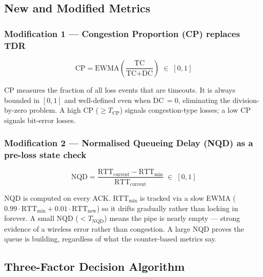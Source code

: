 \documentclass[12pt,a4paper]{article}
\begin{document}
\subsection{New and Modified Metrics}

\subsubsection*{Modification 1 — Congestion Proportion (CP) replaces TDR}

\[
  \text{CP} = \text{EWMA}\!\left(\frac{\text{TC}}{\text{TC}+\text{DC}}\right)
  \;\in\; [0,1]
\]

CP measures the fraction of all loss events that are timeouts. It is always
bounded in $[0,1]$ and well-defined even when DC\,$=0$, eliminating the
division-by-zero problem. A high CP ($\geq T_\text{CP}$) signals
congestion-type losses; a low CP signals bit-error losses.

\subsubsection*{Modification 2 — Normalised Queueing Delay (NQD) as a
pre-loss state check}

\[
  \text{NQD}
  = \frac{\text{RTT}_\text{current} - \text{RTT}_\text{min}}
         {\text{RTT}_\text{current}}
  \;\in\; [0,1]
\]

NQD is computed on every ACK. $\text{RTT}_\text{min}$ is tracked via a slow
EWMA ($0.99 \cdot \text{RTT}_\text{min} + 0.01 \cdot \text{RTT}_\text{new}$)
so it drifts gradually rather than locking in forever. A small NQD
($< T_\text{NQD}$) means the pipe is nearly empty — strong evidence of a
wireless error rather than congestion. A large NQD proves the queue is
building, regardless of what the counter-based metrics say.

\subsection{Three-Factor Decision Algorithm}
\end{document}

